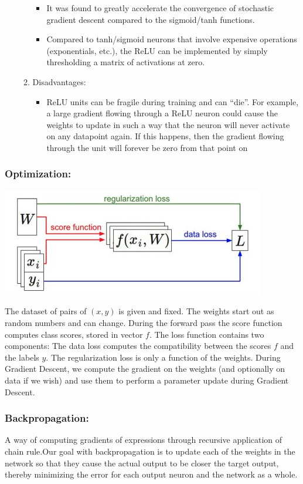 \begin{enumerate}
\begin{enumerate}
\begin{itemize}
\item It was found to greatly accelerate the convergence of stochastic gradient descent compared to the sigmoid/tanh functions.
\item  Compared to tanh/sigmoid neurons that involve expensive operations (exponentials, etc.), the ReLU can be implemented by simply thresholding a matrix of activations at zero.
\end{itemize}
\item Disadvantages:
\begin{itemize}
\item  ReLU units can be fragile during training and can “die”. For example, a large gradient flowing through a ReLU neuron could cause the weights to update in such a way that the neuron will never activate on any datapoint again. If this happens, then the gradient flowing through the unit will forever be zero from that point on
\end{itemize}
\end{enumerate}
\end{enumerate}
\pagebreak
\subsubsection{Optimization:}
\begin{center}
\includegraphics[width=\textwidth]{nn-optimization.png}
\end{center}
The dataset of pairs of $(x,y)$ is given and fixed. The weights start out as random numbers and can change. During the forward pass the score function computes class scores, stored in vector $f$. The loss function contains two components: The data loss computes the compatibility between the scores $f$ and the labels $y$. The regularization loss is only a function of the weights. During Gradient Descent, we compute the gradient on the weights (and optionally on data if we wish) and use them to perform a parameter update during Gradient Descent.
\subsubsection{Backpropagation:}
A way of computing gradients of expressions through recursive application of chain rule.Our goal with backpropagation is to update each of the weights in the network so that they cause the actual output to be closer the target output, thereby minimizing the error for each output neuron and the network as a whole.
